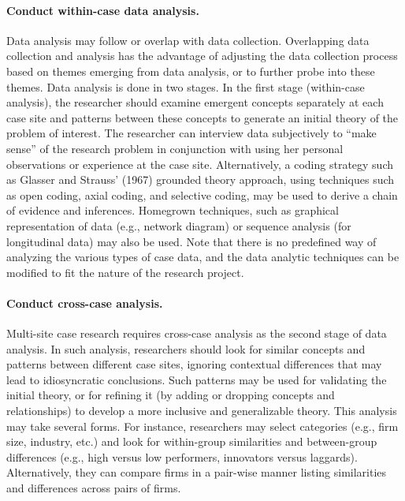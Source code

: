 \paragraph{Conduct within-case data analysis.} Data analysis may follow or overlap with data collection. Overlapping data collection and analysis has the advantage of adjusting the data collection process based on themes emerging from data analysis, or to further probe into these themes. Data analysis is done in two stages. In the first stage (within-case analysis), the researcher should examine emergent concepts separately at each case site and patterns between these concepts to generate an initial theory of the problem of interest. The researcher can interview data subjectively to ``make sense'' of the research problem in conjunction with using her personal observations or experience at the case site. Alternatively, a coding strategy such as Glasser and Strauss' (1967) grounded theory approach, using techniques such as open coding, axial coding, and selective coding, may be used to derive a chain of evidence and inferences. Homegrown techniques, such as graphical representation of data (e.g., network diagram) or sequence analysis (for longitudinal data) may also be used. Note that there is no predefined way of analyzing the various types of case data, and the data analytic techniques can be modified to fit the nature of the research project.

\paragraph{Conduct cross-case analysis.} Multi-site case research requires cross-case analysis as the second stage of data analysis. In such analysis, researchers should look for similar concepts and patterns between different case sites, ignoring contextual differences that may lead to idiosyncratic conclusions. Such patterns may be used for validating the initial theory, or for refining it (by adding or dropping concepts and relationships) to develop a more inclusive and generalizable theory. This analysis may take several forms. For instance, researchers may select categories (e.g., firm size, industry, etc.) and look for within-group similarities and between-group differences (e.g., high versus low performers, innovators versus laggards). Alternatively, they can compare firms in a pair-wise manner listing similarities and differences across pairs of firms.

